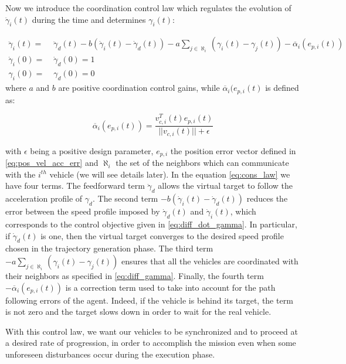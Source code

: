Now we introduce the coordination control law which regulates the evolution of
$\ddot{\gamma}_i(t)$ during the time and determines $\gamma_i(t)$:

\begin{equation} \label{eq:cons_law}
  \begin{aligned}
    \ddot{\gamma}_i(t) = & \; \ddot{\gamma}_d(t) - b (\dot{\gamma}_i(t) - \dot{\gamma}_d(t)) - a \sum_{j \in \aleph_i} (\gamma_i(t) - \gamma_j(t)) - \overline{\alpha}_i (e_{p,i}(t)) \\
    \dot{\gamma}_i(0) = & \; \dot{\gamma}_d(0) = 1 \\
    \gamma_i(0) = & \; \gamma_d(0) = 0
  \end{aligned}
\end{equation}
where $a$ and $b$ are positive coordination control gains, while $\overline{\alpha}_i (e_{p,i}(t)$
is defined as:

\begin{equation} \label{eq:error_term}
  \overline{\alpha}_i (e_{p,i}(t)) = \frac{v_{c,i}^T(t) e_{p,i}(t)}{||v_{c,i}(t)|| + \epsilon}
\end{equation}

with $\epsilon$ being a positive design parameter, $e_{p,i}$ the position
error vector defined in \eqref{eq:pos_vel_acc_err} and $\aleph_i$ the set of the
neighbors which can communicate with the $i^{th}$ vehicle (we will see details later).
In the equation \eqref{eq:cons_law} we have four terms. The feedforward term
$\ddot{\gamma}_d$ allows the virtual target to follow the acceleration profile of
$\gamma_d$.
The second term $- b (\dot{\gamma}_i(t) - \dot{\gamma}_d(t))$ reduces the error
between the speed profile imposed by $\dot{\gamma}_d(t)$ and $\dot{\gamma}_i(t)$,
which corresponds to the control objective given in \eqref{eq:diff_dot_gamma}.
In particular, if $\dot{\gamma}_d(t)$ is one, then the virtual target converges
to the desired speed profile chosen in the trajectory generation phase.
The third term $- a \sum_{j \in \aleph_i} (\gamma_i(t) - \gamma_j(t))$ ensures that
all the vehicles are coordinated with their neighbors as specified in \eqref{eq:diff_gamma}.
Finally, the fourth term $- \overline{\alpha}_i (e_{p,i}(t))$ is a correction term
used to take into account for the path following errors of the agent. Indeed, if the
vehicle is behind its target, the term is not zero and the target slows down in order
to wait for the real vehicle.

With this control law, we want our vehicles to be synchronized and to proceed at
a desired rate of progression, in order to accomplish the mission even when
some unforeseen disturbances occur during the execution phase.
